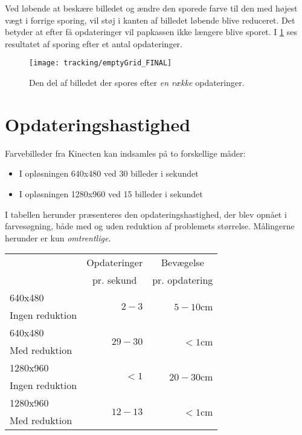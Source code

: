 Ved løbende at beskære billedet og ændre den sporede farve til den med højest vægt i forrige sporing, vil støj i kanten af billedet løbende blive reduceret.
Det betyder at efter få opdateringer vil papkassen ikke længere blive sporet.
I \cref{tracking:img:final} ses resultatet af sporing efter et antal opdateringer.

\begin{figure}[h]
\centering
\texttt{[image: tracking/emptyGrid\_FINAL]}
\caption{Den del af billedet der spores efter \textit{en række} opdateringer.}
\label{tracking:img:final}
\end{figure}

\section{Opdateringshastighed}\label{tracking:updatespeed}
Farvebilleder fra Kinecten kan indsamles på to forskellige måder:
\begin{itemize}
\item I opløsningen 640x480 ved 30 billeder i sekundet
\item I opløsningen 1280x960 ved 15 billeder i sekundet
\end{itemize}

I tabellen herunder præsenteres den opdateringshastighed, der blev opnået i farvesøgning, både med og uden reduktion af problemets størrelse.
Målingerne herunder er kun \emph{omtrentlige}.

{
\newcommand{\mr}[1]{\multirow{2}{*}{#1}}
\newcommand{\ce}[1]{\multicolumn{1}{c|}{#1}}

\begin{center}
\begin{tabular}{| l | r | r |}
\hline
& \ce{Opdateringer} & \ce{Bevægelse}\\
& \ce{pr. sekund} & \ce{pr. opdatering}\\\hline
640x480&\mr{$2-3$}&\mr{$5-10$cm}\\
Ingen reduktion&&\\\hline
640x480&\mr{$29-30$}&\mr{$<1$cm}\\
Med reduktion&&\\\hline
1280x960&\mr{$<1$}&\mr{$20-30$cm}\\
Ingen reduktion&&\\\hline
1280x960&\mr{$12-13$}&\mr{$<1$cm}\\
Med reduktion&&\\\hline
\end{tabular}
\end{center}}
%
%
%
%
%
%
%
